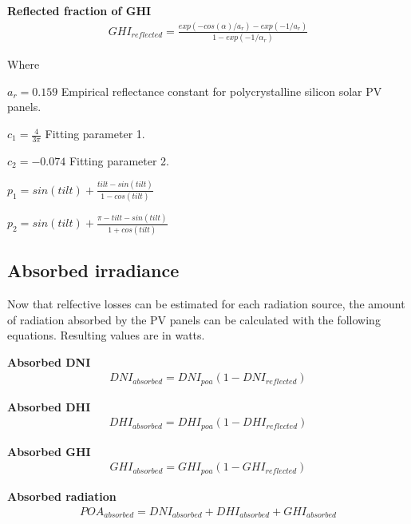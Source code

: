 \noindent\textbf{Reflected fraction of GHI}
%
\begin{equation}
\begin{split}
\label{solar_reflecive_ghi_loss}
GHI_{reflected} = \frac{exp(-cos(\alpha)/a_r)- exp(-1/a_r)}{1-exp(-1/\alpha_r)}
\end{split}
\end{equation}

\noindent Where

$a_r = 0.159$ Empirical reflectance constant for polycrystalline silicon solar PV panels.

$c_1= \frac{4}{3\pi}$  Fitting parameter 1.

$c_2 = -0.074$ Fitting parameter 2.

$p_1= sin(tilt) + \frac{tilt-sin(tilt)}{1-cos(tilt)}$

$p_2= sin(tilt) + \frac{\pi - tilt-sin(tilt)}{1+cos(tilt)}$

\newpage
\subsection{Absorbed irradiance}
Now that relfective losses can be estimated for each radiation source, the amount of radiation absorbed by the PV panels can be calculated with the following equations. Resulting values are in watts.

\noindent\textbf{Absorbed DNI}
\begin{equation}
\begin{split}
DNI_{absorbed} = DNI_{poa}(1-DNI_{reflected})
\end{split}
\end{equation}

\noindent\textbf{Absorbed DHI}
\begin{equation}
\begin{split}
DHI_{absorbed} = DHI_{poa}(1-DHI_{reflected})
\end{split}
\end{equation}

\noindent\textbf{Absorbed GHI}
\begin{equation}
\begin{split}
GHI_{absorbed} = GHI_{poa}(1-GHI_{reflected})
\end{split}
\end{equation}


\noindent\textbf{Absorbed radiation}
\begin{equation}
\begin{split}
POA_{absorbed} = DNI_{absorbed}+DHI_{absorbed}+GHI_{absorbed}
\end{split}
\end{equation}






